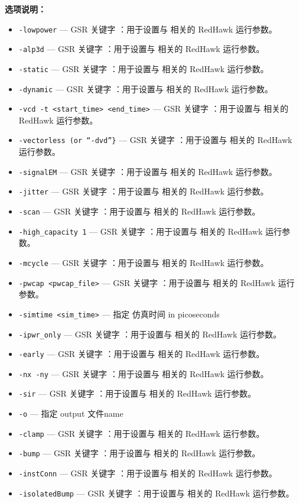 \textbf{选项说明：}
\begin{itemize}
\item \texttt{-lowpower} — GSR 关键字 ：用于设置与  相关的 RedHawk 运行参数。
\item \texttt{-alp3d} — GSR 关键字 ：用于设置与  相关的 RedHawk 运行参数。
\item \texttt{-static} — GSR 关键字 ：用于设置与  相关的 RedHawk 运行参数。
\item \texttt{-dynamic} — GSR 关键字 ：用于设置与  相关的 RedHawk 运行参数。
\item \texttt{-vcd -t <start\_time> <end\_time>} — GSR 关键字 ：用于设置与  相关的 RedHawk 运行参数。
\item \texttt{-vectorless (or “-dvd”\}} — GSR 关键字 ：用于设置与  相关的 RedHawk 运行参数。
\item \texttt{-signalEM} — GSR 关键字 ：用于设置与  相关的 RedHawk 运行参数。
\item \texttt{-jitter} — GSR 关键字 ：用于设置与  相关的 RedHawk 运行参数。
\item \texttt{-scan} — GSR 关键字 ：用于设置与  相关的 RedHawk 运行参数。
\item \texttt{-high\_capacity 1} — GSR 关键字 ：用于设置与  相关的 RedHawk 运行参数。
\item \texttt{-mcycle} — GSR 关键字 ：用于设置与  相关的 RedHawk 运行参数。
\item \texttt{-pwcap <pwcap\_file>} — GSR 关键字 ：用于设置与  相关的 RedHawk 运行参数。
\item \texttt{-simtime <sim\_time>} — 指定 仿真时间 in picoseconds
\item \texttt{-ipwr\_only} — GSR 关键字 ：用于设置与  相关的 RedHawk 运行参数。
\item \texttt{-early} — GSR 关键字 ：用于设置与  相关的 RedHawk 运行参数。
\item \texttt{-nx -ny} — GSR 关键字 ：用于设置与  相关的 RedHawk 运行参数。
\item \texttt{-sir} — GSR 关键字 ：用于设置与  相关的 RedHawk 运行参数。
\item \texttt{-o} — 指定 output 文件name
\item \texttt{-clamp} — GSR 关键字 ：用于设置与  相关的 RedHawk 运行参数。
\item \texttt{-bump} — GSR 关键字 ：用于设置与  相关的 RedHawk 运行参数。
\item \texttt{-instConn} — GSR 关键字 ：用于设置与  相关的 RedHawk 运行参数。
\item \texttt{-isolatedBump} — GSR 关键字 ：用于设置与  相关的 RedHawk 运行参数。

\end{itemize}
